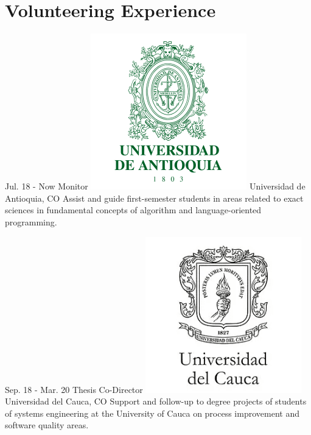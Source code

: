 \documentclass[american]{cv-class}
\begin{document}
\newpage

\section{Volunteering Experience}
\begin{entrylist}
	  
	\entry
	{Jul. 18 - Now}
	{Monitor}
	{{\includegraphics[scale=0.05]{img/udea-logo.png}} Universidad de Antioquia, CO} 
	{\justifying Assist and guide first-semester students in areas related to exact sciences in fundamental concepts of algorithm and language-oriented programming.}
	  
	\entry
	{Sep. 18 - Mar. 20}
	{Thesis Co-Director}
	{{\includegraphics[scale=0.05]{img/unicauca-logo.png}} Universidad del Cauca, CO} 
	{\justifying Support and follow-up to degree projects of students of systems engineering at the University of Cauca on process improvement and software quality areas.}
	

\end{entrylist}
\end{document}
